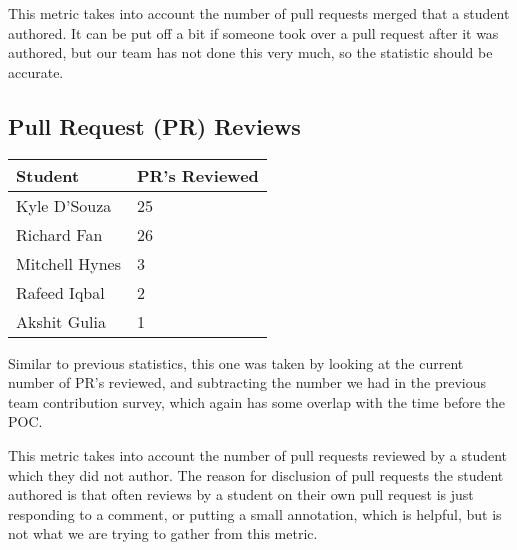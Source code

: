 \documentclass{article}
\begin{document}
This metric takes into account the number of pull requests merged
that a student authored. It can be put off a bit if someone took over
a pull request after it was authored, but our team has not done this
very much, so the statistic should be accurate.

\subsection{Pull Request (PR) Reviews}

\begin{table}[H]
  \centering
  \begin{tabular}{ll}
    \toprule
    \textbf{Student} & \textbf{PR's Reviewed}\\
    \midrule
    Kyle D'Souza & 25\\
    Richard Fan & 26\\
    Mitchell Hynes & 3\\
    Rafeed Iqbal & 2\\
    Akshit Gulia & 1\\
    \bottomrule
  \end{tabular}
\end{table}

Similar to previous statistics, this one was taken by looking at the
current number of PR's reviewed, and subtracting the number we had in
the previous team contribution survey, which again has some overlap
with the time before the POC.

This metric takes into account the number of pull requests reviewed
by a student which they did not author. The reason for disclusion of
pull requests the student authored is that often reviews by a student
on their own pull request is just responding to a comment, or putting
a small annotation, which is helpful, but is not what we are trying
to gather from this metric.
\end{document}
